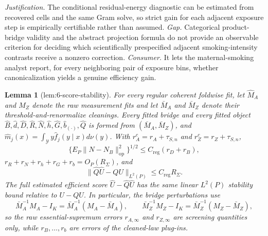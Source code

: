\documentclass{article}
\newtheorem{lemma}{Lemma}
\begin{document}
\par\smallskip\noindent \textit{Justification.} The conditional residual-energy diagnostic can be estimated from recovered cells and the same Gram solve, so strict gain for each adjacent exposure step is empirically certifiable rather than assumed. \textit{Gap.} Categorical product-bridge validity and the abstract projection formula do not provide an observable criterion for deciding which scientifically prespecified adjacent smoking-intensity contrasts receive a nonzero correction. \textit{Consumer.} It lets the maternal-smoking analyst report, for every neighboring pair of exposure bins, whether canonicalization yields a genuine efficiency gain.

\begin{lemma}[lem:6-score-stability]\label{lem:6-score-stability}
For every regular coherent foldwise fit, let \(\widehat M_A\) and \(\widehat M_Z\) denote the raw measurement fits and let \(\bar M_A\) and \(\bar M_Z\) denote their threshold-and-renormalize cleanings.  Every fitted bridge and every fitted object \(\widehat B,\widehat d,\widehat D,\widehat R,\widehat N,\widehat h,\widehat G,\widehat b_{(\cdot)},\widehat Q\) is formed from \((\bar M_A,\bar M_Z)\), and \(\widehat m_j(x)=\int_{\mathcal Y}y\widehat f_j(y\mid x)d\nu(y)\).  With \(r_A^c=r_A+\tau_{S,n}\) and \(r_Z^c=r_Z+\tau_{S,n}\),
\[
 \{E_P\|\widehat N-N_B\|_{\mathrm{op}}^2\}^{1/2}
 \leq C_{\mathrm{reg}}(r_D+r_B),
\]
\(r_R+r_N+r_h+r_G+r_b=O_P(R_\Sigma)\), and
\[
 \|\widehat Q\widehat U-QU\|_{L^2(P)}
 \leq C_{\mathrm{reg}}R_\Sigma.
\]
The full estimated efficient score \(\widehat U-\widehat Q\widehat U\) has the same linear \(L^2(P)\) stability bound relative to \(U-QU\).  In particular, the bridge perturbations use
\[
 \bar M_A^{-1}M_A-I_K=\bar M_A^{-1}(M_A-\bar M_A),
 \qquad
 \bar M_Z^{-1}M_Z-I_K=\bar M_Z^{-1}(M_Z-\bar M_Z),
\]
so the raw essential-supremum errors \(r_{A,\infty}\) and \(r_{Z,\infty}\) are screening quantities only, while \(r_B,\ldots,r_b\) are errors of the cleaned-law plug-ins.
\end{lemma}
\end{document}
